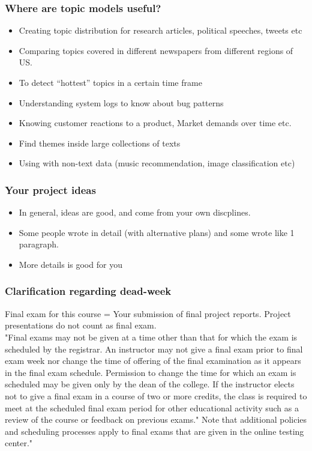 \documentclass{beamer}
\begin{document}
\begin{frame}
\frametitle{Where are topic models useful?}
\begin{itemize}
\item Creating topic distribution for research articles, political speeches, tweets etc
\item Comparing topics covered in different newspapers from different regions of US. 
\item To detect “hottest” topics in a certain time frame
\item Understanding system logs to know about bug patterns
\item Knowing customer reactions to a product, Market demands over time etc.
\item Find themes inside large collections of texts
\item Using with non-text data (music recommendation, image classification etc)
\end{itemize}
\end{frame}

\begin{frame}
\frametitle{Your project ideas}
\begin{itemize}
\item In general, ideas are good, and come from your own discplines.
\item Some people wrote in detail (with alternative plans) and some wrote like 1 paragraph.
\item More details is good for you
\end{itemize}
\end{frame}


\begin{frame}
\frametitle{Clarification regarding dead-week}
Final exam for this course = Your submission of final project reports. Project presentations do not count as final exam. \\
\footnotesize \medskip
"Final exams may not be given at a time other than that for which the exam is scheduled by the registrar. An instructor may not give a final exam prior to final exam week nor change the time of offering of the final examination as it appears in the final exam schedule. Permission to change the time for which an exam is scheduled may be given only by the dean of the college. If the instructor elects not to give a final exam in a course of two or more credits, the class is required to meet at the scheduled final exam period for other educational activity such as a review of the course or feedback on previous exams."  Note that additional policies and scheduling processes apply to final exams that are given in the online testing center."
\end{frame}
\end{document}
